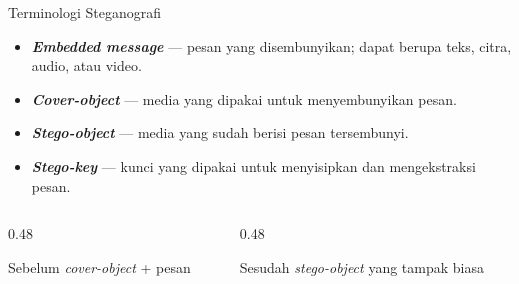 \documentclass[aspectratio=169,11pt]{beamer}
\begin{document}
\begin{frame}{Terminologi Steganografi}
    \begin{itemize}
        \item \textbf{\textit{Embedded message}} --- pesan yang
              disembunyikan; dapat berupa teks, citra, audio, atau video.
        \item \textbf{\textit{Cover-object}} --- media yang dipakai untuk
              menyembunyikan pesan.
        \item \textbf{\textit{Stego-object}} --- media yang sudah berisi
              pesan tersembunyi.
        \item \textbf{\textit{Stego-key}} --- kunci yang dipakai untuk
              menyisipkan dan mengekstraksi pesan.
    \end{itemize}
    \vspace{0.2cm}
    \begin{columns}[T,onlytextwidth]
        \begin{column}{0.48\textwidth}
            \begin{block}{Sebelum}
                \centering
                \textit{cover-object} + pesan
            \end{block}
        \end{column}
        \begin{column}{0.48\textwidth}
            \begin{block}{Sesudah}
                \centering
                \textit{stego-object} yang tampak biasa
            \end{block}
        \end{column}
    \end{columns}
\end{frame}
\end{document}
